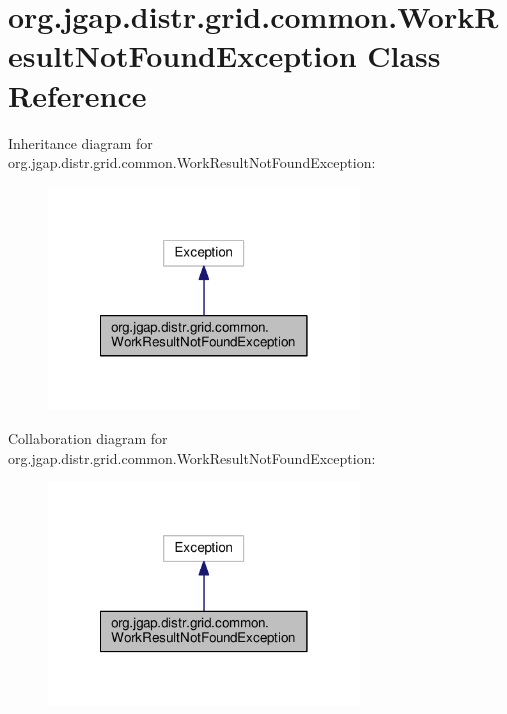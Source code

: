 \hypertarget{classorg_1_1jgap_1_1distr_1_1grid_1_1common_1_1_work_result_not_found_exception}{\section{org.\-jgap.\-distr.\-grid.\-common.\-Work\-Result\-Not\-Found\-Exception Class Reference}
\label{classorg_1_1jgap_1_1distr_1_1grid_1_1common_1_1_work_result_not_found_exception}
}


Inheritance diagram for org.\-jgap.\-distr.\-grid.\-common.\-Work\-Result\-Not\-Found\-Exception\-:
\nopagebreak
\begin{figure}[H]
\begin{center}
\leavevmode
\includegraphics[width=234pt]{classorg_1_1jgap_1_1distr_1_1grid_1_1common_1_1_work_result_not_found_exception__inherit__graph}
\end{center}
\end{figure}


Collaboration diagram for org.\-jgap.\-distr.\-grid.\-common.\-Work\-Result\-Not\-Found\-Exception\-:
\nopagebreak
\begin{figure}[H]
\begin{center}
\leavevmode
\includegraphics[width=234pt]{classorg_1_1jgap_1_1distr_1_1grid_1_1common_1_1_work_result_not_found_exception__coll__graph}
\end{center}
\end{figure}
